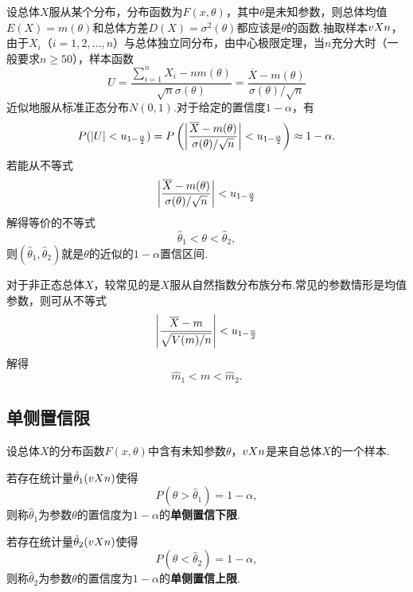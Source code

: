 设总体\(X\)服从某个分布，分布函数为\(F(x,\theta)\)，其中\(\theta\)是未知参数，则总体均值\(E(X)=m(\theta)\)和总体方差\(D(X)=\sigma^2(\theta)\)都应该是\(\theta\)的函数.抽取样本\(v{X}{n}\)，由于\(X_i\)（\(i=1,2,\dotsc,n\)）与总体独立同分布，由中心极限定理，当\(n\)充分大时（一般要求\(n \geqslant 50\)），样本函数\[
U = \frac{\sum\limits_{i=1}^n{X_i} - n m(\theta)}{\sqrt{n} \sigma(\theta)}
= \frac{\overline{X} - m(\theta)}{\sigma(\theta) / \sqrt{n}}
\]近似地服从标准正态分布\(N(0,1)\).对于给定的置信度\(1-\alpha\)，有\[
P(\abs{U}<u_{1-\frac{\alpha}{2}})
= P\left(\abs{\frac{\overline{X} - m(\theta)}{\sigma(\theta) / \sqrt{n}}}<u_{1-\frac{\alpha}{2}}\right)
\approx 1-\alpha.
\]若能从不等式\[
\abs{\frac{\overline{X} - m(\theta)}{\sigma(\theta) / \sqrt{n}}}<u_{1-\frac{\alpha}{2}}
\]解得等价的不等式\[
\hat{\theta}_1 < \theta < \hat{\theta}_2,
\]则\((\hat{\theta}_1, \hat{\theta}_2)\)就是\(\theta\)的近似的\(1-\alpha\)置信区间.

对于非正态总体\(X\)，较常见的是\(X\)服从自然指数分布族分布.常见的参数情形是均值参数，则可从不等式\[
\abs{\frac{\overline{X} - m}{\sqrt{V(m) / n}}}<u_{1-\frac{\alpha}{2}}
\]解得\[
\hat{m}_1 < m < \hat{m}_2.
\]

\subsection{单侧置信限}
\begin{definition}
设总体\(X\)的分布函数\(F(x,\theta)\)中含有未知参数\(\theta\)，\(v{X}{n}\)是来自总体\(X\)的一个样本.

若存在统计量\(\hat{\theta}_1(v{X}{n})\)使得\[
P(\theta>\hat{\theta}_1)=1-\alpha,
\]则称\(\hat{\theta}_1\)为参数\(\theta\)的置信度为\(1-\alpha\)的\textbf{单侧置信下限}.

若存在统计量\(\hat{\theta}_2(v{X}{n})\)使得\[
P(\theta<\hat{\theta}_2)=1-\alpha,
\]则称\(\hat{\theta}_2\)为参数\(\theta\)的置信度为\(1-\alpha\)的\textbf{单侧置信上限}.
\end{definition}
